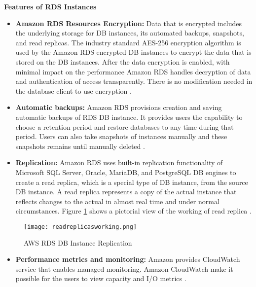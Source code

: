 \textbf{Features of RDS Instances}
\begin{itemize}
    \item \textbf{Amazon RDS Resources Encryption:} Data that is encrypted includes the underlying storage for DB instances, its automated backups, snapshots, and read replicas.
    The industry standard AES-256 encryption algorithm is used by the Amazon RDS encrypted DB instances to encrypt the data that is stored on the DB instances.
    After the data encryption is enabled, with minimal impact on the performance Amazon RDS handles decryption of data and authentication of access transparently.
    There is no modification needed in the database client to use encryption \cite{37}.
\end{itemize}
\begin{itemize}
    \item \textbf{Automatic backups:} Amazon RDS provisions creation and saving automatic backups of RDS DB instance.
    It
    provides users the capability to choose a retention
    period and restore databases to any time during that period.
    Users can also take snapshots of instances manually and these snapshots remains until manually deleted \cite{37}.
\end{itemize}
\begin{itemize}
    \item \textbf{Replication:} Amazon RDS uses built-in
    replication functionality of Microsoft SQL Server, Oracle, MariaDB, and PostgreSQL DB engines to create a read replica, which is a special type of DB instance, from the source DB instance.
    A read replica represents a copy of the actual instance that reflects changes to the actual in almost real time and under normal circumstances.
    Figure \ref{fig:readreplicasworking} shows a pictorial view of the working of read replica \cite{37}.
\end{itemize}
\begin{figure}
    \centering
    \texttt{[image: readreplicasworking.png]}
    \caption{AWS RDS DB Instance Replication}{\cite{38}}
    \label{fig:readreplicasworking}
\end{figure}
\begin{itemize}
    \item \textbf{Performance metrics and monitoring:} Amazon provides CloudWatch service that enables managed
    monitoring.
    Amazon CloudWatch make it possible for the users to
    view capacity and I/O metrics \cite{37}.
\end{itemize}


